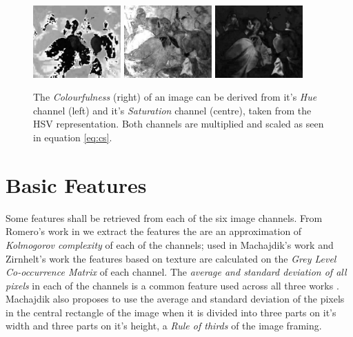 \documentclass[11pt,a4paper,draft]{report}
\begin{document}
\begin{multicols}{2}
\begin{figure}[tbp]
\centering
\includegraphics[width=0.30\textwidth]{H_caravaggio_1962_139_1}
\includegraphics[width=0.30\textwidth]{SHSV_caravaggio_1962_139_1}
\includegraphics[width=0.30\textwidth]{CS_caravaggio_1962_139_1}
\caption[Colourfulness]{The \emph{Colourfulness} (right) of an image can be
derived from it's \emph{Hue} channel (left) and it's \emph{Saturation} channel
(centre), taken from the HSV representation.  Both channels are multiplied and
scaled as seen in equation \ref{eq:cs}.}
\label{fig:cs}
\end{figure}


\section{Basic Features}

Some features shall be retrieved from each of the six image channels.  From
Romero's work in \cite{rmc12ajs} we extract the features the are an
approximation of \emph{Kolmogorov complexity} of each of the channels; used in
Machajdik's work \cite{mach10clas} and Zirnhelt's work \cite{zirnhelt07art} the
features based on texture are calculated on the \emph{Grey Level Co-occurrence
Matrix} of each channel.  The \emph{average and standard deviation of all
pixels} in each of the channels is a common feature used across all three works
\cite{jma12clas,zirnhelt07art,mach10clas}.  Machajdik \cite{mach10clas} also
proposes to use the average and standard deviation of the pixels in the central
rectangle of the image when it is divided into three parts on it's width and
three parts on it's height, a \emph{Rule of thirds} of the image framing.


\end{multicols}
\end{document}
